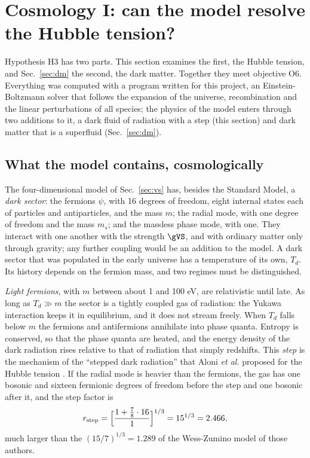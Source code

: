 
\section{Cosmology I: can the model resolve the Hubble tension?}
\label{sec:hubble}

Hypothesis H3 has two parts. This section examines the first, the Hubble tension, and
Sec.~\ref{sec:dm} the second, the dark matter. Together they meet objective O6. Everything was
computed with a program written for this project, an Einstein-Boltzmann solver that follows the
expansion of the universe, recombination and the linear perturbations of all species; the physics of
the model enters through two additions to it, a dark fluid of radiation with a step (this section)
and dark matter that is a superfluid (Sec.~\ref{sec:dm}).

\subsection{What the model contains, cosmologically}
\label{sec:darksector}

The four-dimensional model of Sec.~\ref{sec:vs} has, besides the Standard Model, a \emph{dark
sector}: the fermions $\psi$, with 16 degrees of freedom, eight internal states each of particles and
antiparticles, and the mass $m$; the radial mode, with one degree of freedom and the mass $m_s$; and
the massless phase mode, with one. They interact with one another with the strength $\gVS$, and with
ordinary matter only through gravity; any further coupling would be an addition to the model. A dark
sector that was populated in the early universe has a temperature of its own, $T_d$. Its history
depends on the fermion mass, and two regimes must be distinguished.

\emph{Light fermions}, with $m$ between about 1 and 100 eV, are relativistic until late. As long as
$T_d\gg m$ the sector is a tightly coupled gas of radiation: the Yukawa interaction keeps it in
equilibrium, and it does not stream freely. When $T_d$ falls below $m$ the fermions and antifermions
annihilate into phase quanta. Entropy is conserved, so that the phase quanta are heated, and the
energy density of the dark radiation rises relative to that of radiation that simply redshifts. This
\emph{step} is the mechanism of the ``stepped dark radiation'' that Aloni \emph{et al.} proposed for
the Hubble tension \cite{Aloni2022}. If the radial mode is heavier than the fermions, the gas has one
bosonic and sixteen fermionic degrees of freedom before the step and one bosonic after it, and the
step factor is
\begin{equation}
r_{\rm step}=\Big[\frac{1+\tfrac78\cdot16}{1}\Big]^{1/3}=15^{1/3}=2.466,
\label{eq:rstep}
\end{equation}
much larger than the $(15/7)^{1/3}=1.289$ of the Wess-Zumino model of those authors.

